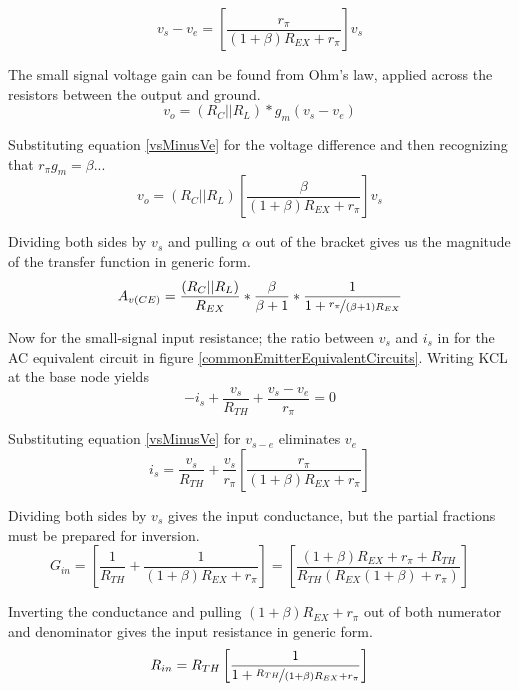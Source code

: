 \documentclass[titlepage, letterpaper, 10.5pt]{article}
\begin{document}
\begin{equation}
v_{s}-v_{e}=
\left[\frac{r_{\pi}}{(1+\beta)R_{EX}+r_{\pi}}\right]v_{s}
\label{vsMinusVe}
\end{equation}

The small signal voltage gain can be found from Ohm's law, applied
across the resistors between the output and ground.
\begin{equation*}
v_{o}=(R_{C}||R_{L})*g_{m}(v_{s}-v_{e})
\end{equation*}

Substituting equation \ref{vsMinusVe} for the voltage difference and
then recognizing that $r_{\pi}g_{m}=\beta$...
\begin{equation*}
v_{o}=(R_{C}||R_{L})
\left[\frac{\beta}{(1+\beta)R_{EX}+r_{\pi}}\right]v_{s}
\end{equation*}

Dividing both sides by $v_{s}$ and pulling $\alpha$ out of the
bracket gives us the magnitude of the transfer function in generic
form.
\begin{equation}
A_{v(CE)}=\frac{(R_{C}||R_{L})}{R_{EX}}*\frac{\beta}{\beta+1}*
\frac{1}{1+\nicefrac{r_{\pi}}{(\beta+1)R_{EX}}}
\label{ceAv}
\end{equation}

Now for the small-signal input resistance; the ratio between
$v_{s}$ and $i_{s}$ in for the AC equivalent circuit in figure
\ref{commonEmitterEquivalentCircuits}. Writing KCL at the base node
yields
\begin{equation*}
-i_{s}+\frac{v_{s}}{R_{TH}}+\frac{v_{s}-v_{e}}{r_{\pi}}=0
\end{equation*}

Substituting equation \ref{vsMinusVe} for $v_{s-e}$ 
eliminates $v_{e}$
\begin{equation*}
i_{s}=\frac{v_{s}}{R_{TH}}+\frac{v_{s}}{r_{\pi}}
\left[\frac{r_{\pi}}{(1+\beta)R_{EX}+r_{\pi}}\right]
\end{equation*}

Dividing both sides by $v_{s}$ gives the input conductance,
but the partial fractions must be prepared for inversion.
\begin{equation*}
G_{in}=
\left[\frac{1}{R_{TH}}+\frac{1}{(1+\beta)R_{EX}+r_{\pi}}\right]=
\left[\frac{(1+\beta)R_{EX}+r_{\pi}+R_{TH}}
{R_{TH}(R_{EX}(1+\beta)+r_{\pi})}\right]
\end{equation*}

Inverting the conductance and pulling
$(1+\beta)R_{EX}+r_{\pi}$ out of both numerator and denominator gives
the input resistance in generic form.
\begin{equation*}
R_{in}=R_{TH}
\left[\frac{1}{1+\nicefrac{R_{TH}}{(1+\beta)R_{EX}+r_{\pi}}}\right]
\end{equation*}
\end{document}
